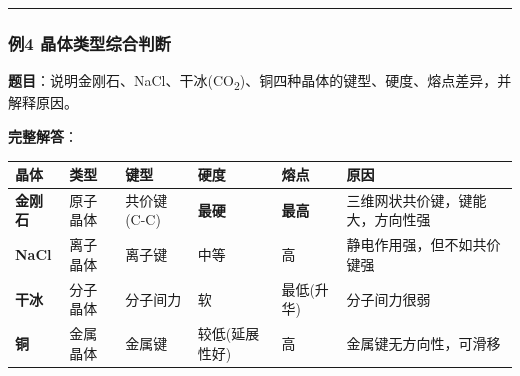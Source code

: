 \begin{center}\rule{0.5\linewidth}{0.5pt}\end{center}

\subsubsection{例4 晶体类型综合判断}\label{ux4f8b4-ux6676ux4f53ux7c7bux578bux7efcux5408ux5224ux65ad}

\textbf{题目}：说明金刚石、NaCl、干冰(CO\textsubscript{2})、铜四种晶体的键型、硬度、熔点差异，并解释原因。

\textbf{完整解答}：

{\def\LTcaptype{none} %
\begin{longtable}[]{@{}
  >{\raggedright\arraybackslash}p{}
  >{\raggedright\arraybackslash}p{}
  >{\raggedright\arraybackslash}p{}
  >{\centering\arraybackslash}p{}
  >{\centering\arraybackslash}p{}
  >{\raggedright\arraybackslash}p{}@{}}
\toprule\noalign{}
\begin{minipage}[b]{\linewidth}\raggedright
晶体
\end{minipage} & \begin{minipage}[b]{\linewidth}\raggedright
类型
\end{minipage} & \begin{minipage}[b]{\linewidth}\raggedright
键型
\end{minipage} & \begin{minipage}[b]{\linewidth}\centering
硬度
\end{minipage} & \begin{minipage}[b]{\linewidth}\centering
熔点
\end{minipage} & \begin{minipage}[b]{\linewidth}\raggedright
原因
\end{minipage} \\
\midrule\noalign{}
\endhead
\bottomrule\noalign{}
\endlastfoot
\textbf{金刚石} & 原子晶体 & 共价键(C-C) & \textbf{最硬} & \textbf{最高} & 三维网状共价键，键能大，方向性强 \\
\textbf{NaCl} & 离子晶体 & 离子键 & 中等 & 高 & 静电作用强，但不如共价键强 \\
\textbf{干冰} & 分子晶体 & 分子间力 & 软 & 最低(升华) & 分子间力很弱 \\
\textbf{铜} & 金属晶体 & 金属键 & 较低(延展性好) & 高 & 金属键无方向性，可滑移 \\
\end{longtable}
}

